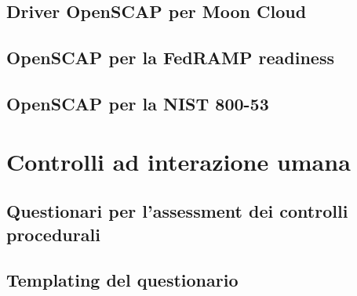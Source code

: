 \documentclass[../main.tex]{subfiles}
\begin{document}
\subsection{Driver OpenSCAP per Moon Cloud}
\subsection{OpenSCAP per la FedRAMP readiness}
\subsection{OpenSCAP per la NIST 800-53}
\section{Controlli ad interazione umana}
\subsection{Questionari per l'assessment dei controlli procedurali}
\subsection{Templating del questionario}
\end{document}
